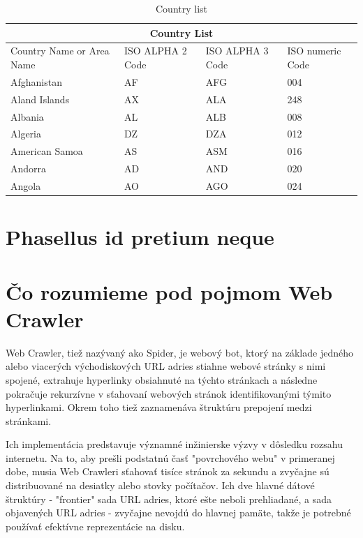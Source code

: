 \begin{table}[!ht]
	\caption{Country list}\label{t:1}
	\smallskip
	\centering

	\begin{tabular}{ |p{3cm}||p{3cm}|p{3cm}|p{3cm}|  }
		\hline
		\multicolumn{4}{|c|}{Country List} \\
		\hline
		Country Name or Area Name& ISO ALPHA 2 Code &ISO ALPHA 3 Code&ISO numeric Code\\
		\hline
		Afghanistan & AF & AFG & 004\\
		Aland Islands & AX & ALA & 248\\
		Albania & AL & ALB & 008\\
		Algeria & DZ & DZA & 012\\
		American Samoa & AS & ASM & 016\\
		Andorra & AD & AND & 020\\
		Angola & AO & AGO & 024\\
		\hline
	\end{tabular}
\end{table}


\section{Phasellus id pretium neque}
\blindtext

\blindtext

\section{Čo rozumieme pod pojmom Web Crawler}

Web Crawler, tiež nazývaný ako Spider, je webový bot, ktorý na základe jedného alebo viacerých východiskových URL adries stiahne webové stránky s nimi spojené, extrahuje hyperlinky obsiahnuté na týchto stránkach a následne pokračuje rekurzívne v sťahovaní webových stránok identifikovanými týmito hyperlinkami. Okrem toho tiež zaznamenáva štruktúru prepojení medzi stránkami. \cite{introToInfRetrieval}

Ich implementácia predstavuje významné inžinierske výzvy v dôsledku rozsahu internetu. Na to, aby prešli podstatnú časť "povrchového webu" v primeranej dobe, musia Web Crawleri sťahovať tisíce stránok za sekundu a zvyčajne sú distribuované na desiatky alebo stovky počítačov. Ich dve hlavné dátové štruktúry - "frontier" sada URL adries, ktoré ešte neboli prehliadané, a sada objavených URL adries - zvyčajne nevojdú do hlavnej pamäte, takže je potrebné používať efektívne reprezentácie na disku. \cite{encykOfDatabases}


